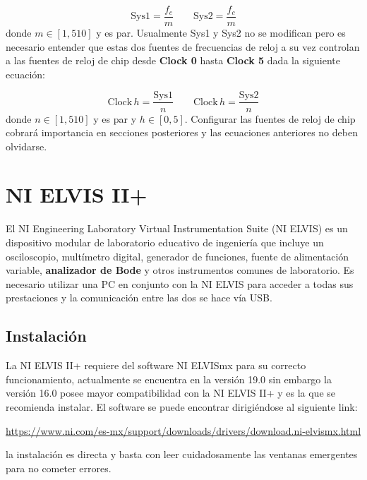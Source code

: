 \begin{equation}
\mathrm{Sys1} = \frac{f_{c}}{m} \qquad \mathrm{Sys2} = \frac{f_{c}}{m}
\label{ec:sys_clock}
\end{equation}
donde $m\in [1,510]$ y es par. Usualmente Sys1 y Sys2 no se modifican pero es necesario entender que estas dos fuentes de frecuencias de reloj a su vez controlan a las fuentes de reloj de chip desde \textbf{Clock 0} hasta \textbf{Clock 5} dada la siguiente ecuación:

\begin{equation}
	\mathrm{Clock\,} h = \frac{\mathrm{Sys1}}{n}	\qquad   \mathrm{Clock\,} h = \frac{\mathrm{Sys2}}{n}
	\label{ec:clock_h}
\end{equation}
donde $n\in[1,510]$ y es par y $h\in[0,5]$. Configurar las fuentes de reloj de chip cobrará importancia en secciones posteriores y las ecuaciones anteriores no deben olvidarse.

\section{NI ELVIS II+}

El NI Engineering Laboratory Virtual Instrumentation Suite (NI ELVIS) es un dispositivo modular de laboratorio educativo de ingeniería que incluye un osciloscopio, multímetro digital, generador de funciones, fuente de alimentación variable, \textbf{analizador de Bode} y otros instrumentos comunes de laboratorio. Es necesario utilizar una PC en conjunto con la NI ELVIS para acceder a todas sus prestaciones y la comunicación entre las dos se hace vía USB.

\subsection{Instalación}

La NI ELVIS II+ requiere del software NI ELVISmx para su correcto funcionamiento, actualmente se encuentra en la versión 19.0 sin embargo la versión 16.0 posee mayor compatibilidad con la NI ELVIS II+ y es la que se recomienda instalar. El software se puede encontrar dirigiéndose al siguiente link:  

	\begin{center}
		\url{https://www.ni.com/es-mx/support/downloads/drivers/download.ni-elvismx.html}
	\end{center}
la instalación es directa y basta con leer cuidadosamente las ventanas emergentes para no cometer errores.

